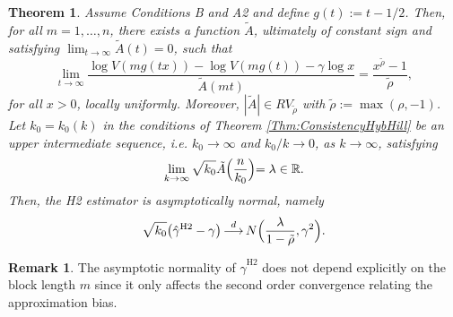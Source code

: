 \documentclass[11pt, a4paper, oneside]{article}
\numberwithin{equation}{section}
\theoremstyle{plain}
\newtheorem{thm}{Theorem}
\theoremstyle{definition}
\newtheorem{rem}{Remark}
\newcommand{\field}[1]{\mathbb{#1}}
\newcommand{\real}{\ensuremath{{\field{R}}}}
\newcommand{\limit}[1]{\ensuremath{\displaystyle {\lim_{#1 \rightarrow{\infty}}}}}
\newcommand{\conv}[1]{\ensuremath{\, \displaystyle {\mathop{\longrightarrow}^{#1}}}\, }
\begin{document}
\begin{thm}\label{Thm:AN}
   Assume Conditions B and A2 and define $g(t):= t-1/2$. Then, for all $m= 1, \ldots, n$, there exists a function $\tilde{A}$, ultimately of constant sign and satisfying $\lim_{t \rightarrow \infty}\tilde{A}(t)=0$, such that
 \begin{equation}\label{2RVlogVg}
 \limit{t} \frac{\log V(mg(tx))-\log V(mg(t))-\gamma\log x}{\tilde{A}(mt)}= 
 \frac{x^{\tilde{\rho}}-1}{\tilde{\rho}},
\end{equation}
for all $x>0$, locally uniformly. Moreover, $|\tilde{A}| \in RV_{\tilde{\rho}}$ with  $\tilde{\rho}:=\max( \rho,-1)$. Let $k_0=k_0(k)$ in the conditions of Theorem \ref{Thm:ConsistencyHybHill} be an upper intermediate sequence, i.e. $k_0 \rightarrow \infty$ and $k_0/k \rightarrow 0$, as $k\rightarrow\infty$, satisfying
\begin{equation*}
     \lim\limits_{k\to \infty} \sqrt{k_0}\tilde{A}\Bigl(\frac{n}{k_0}\Bigl)=\lambda \in \real.
\end{equation*}
Then, the H2 estimator is asymptotically normal, namely
\begin{equation*}
         \sqrt{k_0}\bigl(\hat{\gamma}^{\textrm{H2}}-\gamma \bigl)\conv{d}N\Bigl(\frac{\lambda}{1-\tilde{\rho}},\gamma^2\Bigl).
\end{equation*}
\end{thm}
\begin{rem}
	The asymptotic normality of $\hat{\gamma}^{\textrm{H2}}$ does not depend explicitly on the block length $m$ since it only affects the second order convergence relating the approximation bias. 
\end{rem}
\end{document}
